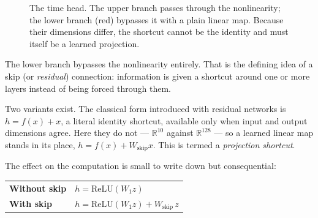 \documentclass[11pt,a4paper]{article}
\newcommand{\R}{\mathbb{R}}
\theoremstyle{definition}
\begin{document}
\begin{figure}[htbp]
\centering
{}
\caption{The time head. The upper branch passes through the nonlinearity; the
lower branch (red) bypasses it with a plain linear map. Because their
dimensions differ, the shortcut cannot be the identity and must itself be a
learned projection.}
\label{fig:skip}
\end{figure}

The lower branch bypasses the nonlinearity entirely. That is the defining idea
of a skip (or \emph{residual}) connection: information is given a shortcut
around one or more layers instead of being forced through them.

Two variants exist. The classical form introduced with residual networks is
$h = f(x) + x$, a literal identity shortcut, available only when input and
output dimensions agree. Here they do not --- $\R^{10}$ against $\R^{128}$ ---
so a learned linear map stands in its place, $h = f(x) + W_{\text{skip}}x$. This
is termed a \emph{projection shortcut}.

The effect on the computation is small to write down but consequential:

\begin{center}
\begin{tabular}{@{}ll@{}}
\toprule
\textbf{Without skip} & $h = \mathrm{ReLU}(W_1 z)$ \\
\textbf{With skip}    & $h = \mathrm{ReLU}(W_1 z) + W_{\text{skip}}\, z$ \\
\bottomrule
\end{tabular}
\end{center}
\end{document}
